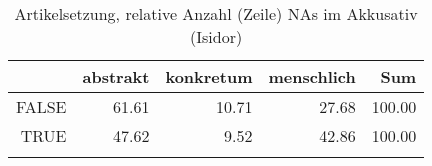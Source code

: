 \begin{table}[ht]
\centering
\begin{tabular}{rrrrr}
  \lsptoprule
 & abstrakt & konkretum & menschlich & Sum \\ 
  \midrule
FALSE & 61.61 & 10.71 & 27.68 & 100.00 \\ 
  TRUE & 47.62 & 9.52 & 42.86 & 100.00 \\ 
   \lspbottomrule
\end{tabular}
\caption{Artikelsetzung, relative Anzahl (Zeile) NAs im Akkusativ (Isidor)} 
\end{table}
